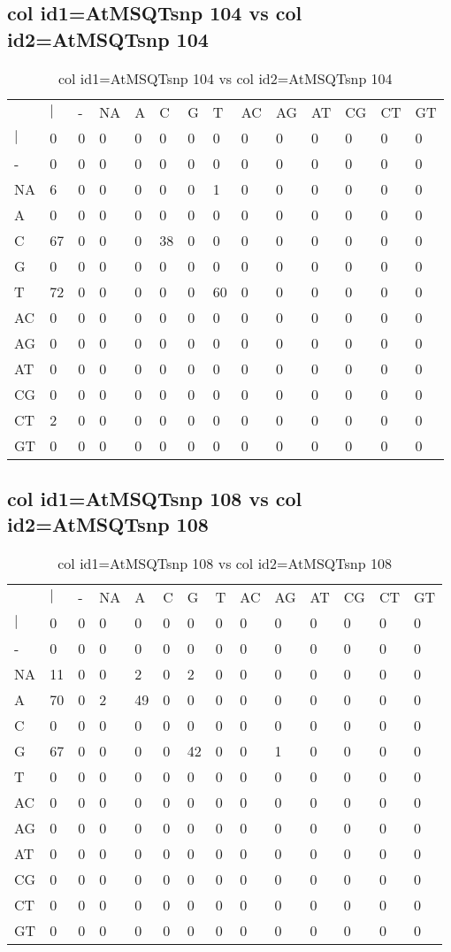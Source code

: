 \subsection{col id1=AtMSQTsnp 104 vs col id2=AtMSQTsnp 104}
\begin{center}
\begin{longtable}{|l|l|l|l|l|l|l|l|l|l|l|l|l|l|}
\caption{col id1=AtMSQTsnp 104 vs col id2=AtMSQTsnp 104} \label{table_dm500}\\
\hline
\\
\hline
&$|$&-&NA&A&C&G&T&AC&AG&AT&CG&CT&GT\\
$|$&0&0&0&0&0&0&0&0&0&0&0&0&0\\
-&0&0&0&0&0&0&0&0&0&0&0&0&0\\
NA&6&0&0&0&0&0&1&0&0&0&0&0&0\\
A&0&0&0&0&0&0&0&0&0&0&0&0&0\\
C&67&0&0&0&38&0&0&0&0&0&0&0&0\\
G&0&0&0&0&0&0&0&0&0&0&0&0&0\\
T&72&0&0&0&0&0&60&0&0&0&0&0&0\\
AC&0&0&0&0&0&0&0&0&0&0&0&0&0\\
AG&0&0&0&0&0&0&0&0&0&0&0&0&0\\
AT&0&0&0&0&0&0&0&0&0&0&0&0&0\\
CG&0&0&0&0&0&0&0&0&0&0&0&0&0\\
CT&2&0&0&0&0&0&0&0&0&0&0&0&0\\
GT&0&0&0&0&0&0&0&0&0&0&0&0&0\\
\hline
\end{longtable}
\end{center}

\subsection{col id1=AtMSQTsnp 108 vs col id2=AtMSQTsnp 108}
\begin{center}
\begin{longtable}{|l|l|l|l|l|l|l|l|l|l|l|l|l|l|}
\caption{col id1=AtMSQTsnp 108 vs col id2=AtMSQTsnp 108} \label{table_dm502}\\
\hline
\\
\hline
&$|$&-&NA&A&C&G&T&AC&AG&AT&CG&CT&GT\\
$|$&0&0&0&0&0&0&0&0&0&0&0&0&0\\
-&0&0&0&0&0&0&0&0&0&0&0&0&0\\
NA&11&0&0&2&0&2&0&0&0&0&0&0&0\\
A&70&0&2&49&0&0&0&0&0&0&0&0&0\\
C&0&0&0&0&0&0&0&0&0&0&0&0&0\\
G&67&0&0&0&0&42&0&0&1&0&0&0&0\\
T&0&0&0&0&0&0&0&0&0&0&0&0&0\\
AC&0&0&0&0&0&0&0&0&0&0&0&0&0\\
AG&0&0&0&0&0&0&0&0&0&0&0&0&0\\
AT&0&0&0&0&0&0&0&0&0&0&0&0&0\\
CG&0&0&0&0&0&0&0&0&0&0&0&0&0\\
CT&0&0&0&0&0&0&0&0&0&0&0&0&0\\
GT&0&0&0&0&0&0&0&0&0&0&0&0&0\\
\hline
\end{longtable}
\end{center}

